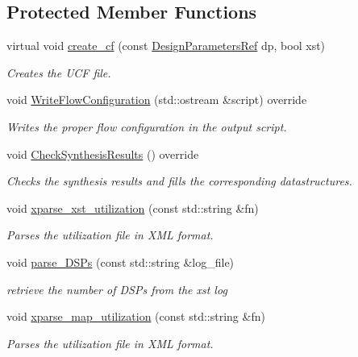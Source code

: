 \subsection*{Protected Member Functions}
\begin{DoxyCompactItemize}
\item 
virtual void \hyperlink{classXilinxBackendFlow_af8b92a68a04a001e2f4b43fd14dd21b7}{create\+\_\+cf} (const \hyperlink{DesignParameters_8hpp_ae36bb1c4c9150d0eeecfe1f96f42d157}{Design\+Parameters\+Ref} dp, bool xst)
\begin{DoxyCompactList}\small\item\em Creates the U\+CF file. \end{DoxyCompactList}\item 
void \hyperlink{classXilinxBackendFlow_a0c32028a834101dcd6b6e6df5481dbe4}{Write\+Flow\+Configuration} (std\+::ostream \&script) override
\begin{DoxyCompactList}\small\item\em Writes the proper flow configuration in the output script. \end{DoxyCompactList}\item 
void \hyperlink{classXilinxBackendFlow_a4c059a8e048f5780fa09f00ff7faf817}{Check\+Synthesis\+Results} () override
\begin{DoxyCompactList}\small\item\em Checks the synthesis results and fills the corresponding datastructures. \end{DoxyCompactList}\item 
void \hyperlink{classXilinxBackendFlow_a396e92b4d7e3867c814afa25787a7ed6}{xparse\+\_\+xst\+\_\+utilization} (const std\+::string \&fn)
\begin{DoxyCompactList}\small\item\em Parses the utilization file in X\+ML format. \end{DoxyCompactList}\item 
void \hyperlink{classXilinxBackendFlow_aad2aac0a9f9a4158831cfd4f842a8b24}{parse\+\_\+\+D\+S\+Ps} (const std\+::string \&log\+\_\+file)
\begin{DoxyCompactList}\small\item\em retrieve the number of D\+S\+Ps from the xst log \end{DoxyCompactList}\item 
void \hyperlink{classXilinxBackendFlow_aee48e3dc259b3310102e708480a99410}{xparse\+\_\+map\+\_\+utilization} (const std\+::string \&fn)
\begin{DoxyCompactList}\small\item\em Parses the utilization file in X\+ML format. \end{DoxyCompactList}\item 

\end{DoxyCompactItemize}
